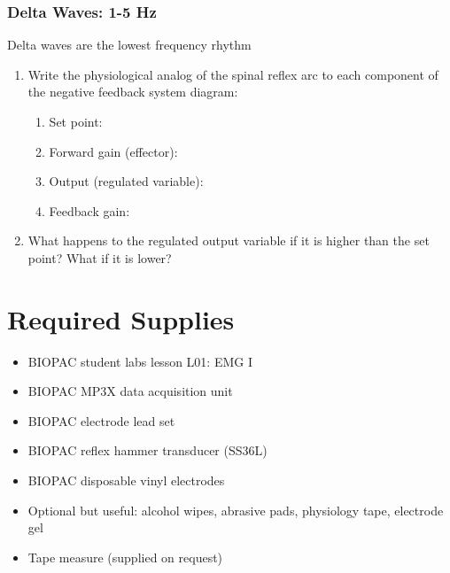 \documentclass{article}
\begin{document}
\subsubsection*{Delta Waves: 1-5 Hz}
Delta waves are the lowest frequency rhythm

\begin{enumerate}
	\item Write the physiological analog of the spinal reflex arc to each component of the negative feedback system diagram:
	\begin{enumerate}
		\item Set point:
		\item Forward gain (effector):
		\item Output (regulated variable):
		\item Feedback gain:
	\end{enumerate}
	\item What happens to the regulated output variable if it is higher than the set point? What if it is lower?
\end{enumerate}

\section*{Required Supplies}
\begin{itemize}
	\item BIOPAC student labs lesson L01: EMG I
	\item BIOPAC MP3X data acquisition unit
	\item BIOPAC electrode lead set
	\item BIOPAC reflex hammer transducer (SS36L)
	\item BIOPAC disposable vinyl electrodes
	\item Optional but useful: alcohol wipes, abrasive pads, physiology tape, electrode gel
	\item Tape measure (supplied on request)
\end{itemize}
\end{document}
